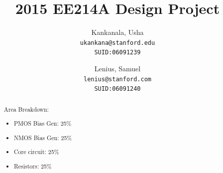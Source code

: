 \documentclass[12pt,a4paper]{article}
\begin{document}

\setcounter{page}{0}



\author{
  Kankanala, Usha\\
  \texttt{ukankana@stanford.edu}\\
  \texttt{SUID:06091239}
  \and
  Lenius, Samuel\\
  \texttt{lenius@stanford.com}\\
  \texttt{SUID:06091240}
}

\title{2015 EE214A Design Project}

\maketitle


\begin{abstract}
  Area Breakdown:
  \begin{addmargin}[1em]{0em}
  \begin{itemize}
    \item PMOS Bias Gen: 25\%
    \item NMOS Bias Gen: 25\%
    \item Core circuit: 25\%
    \item Resistors: 25\%
  \end{itemize}
  \end{addmargin}
\end{abstract}

\pagebreak

\end{document}
